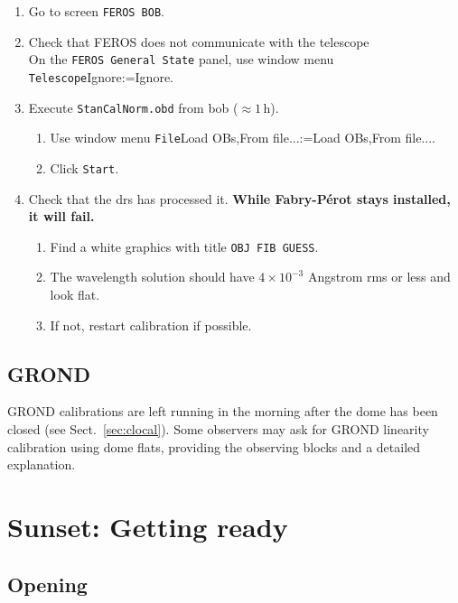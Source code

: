 \documentclass[11pt,fleqn,a4paper]{book}
\makeatletter
\def\menu#1#2{\texttt{#1}\ifx{}#2\else\@for\@x:=#2\do{$\rightarrow$\texttt{\@x}}\fi}
\def\wmenu#1#2{window menu \menu{#1}{#2}}
\def\fetchob{\wmenu{File}{Load OBs,From file...}}
\makeatother
\begin{document}
\begin{enumerate}
  \item Go to screen \texttt{FEROS BOB}.
  \item Check that FEROS does not communicate with the telescope\\
        On the \texttt{FEROS \gls{General State}} panel, use \wmenu{Telescope}{Ignore}.
  \item Execute \texttt{StanCalNorm.obd} from \gls{bob} ($\approx 1$\,h).
    \begin{enumerate}
       \item Use \fetchob.
       \item Click \texttt{Start}.
    \end{enumerate}
  \item Check that the \gls{drs} has processed it.  \textbf{While Fabry-Pérot stays installed, it will fail.}
    \begin{enumerate}
      \item Find a white graphics with title \texttt{OBJ FIB GUESS}.
      \item The wavelength solution should have $4 \times 10^{-3}$ Angstrom
         rms or less and look flat.
      \item If not, restart calibration if possible.
    \end{enumerate}
\end{enumerate}

\section{GROND}

GROND calibrations are left running in the morning after the \gls{dome} has been closed (see Sect.~\ref{sec:clocal}). Some observers may ask for GROND linearity calibration using \gls{dome flats}, providing the observing blocks and a detailed explanation.



\chapter{Sunset: Getting ready}
\label{chap:sunset}

\section{Opening}
\label{sec:open}
\end{document}
